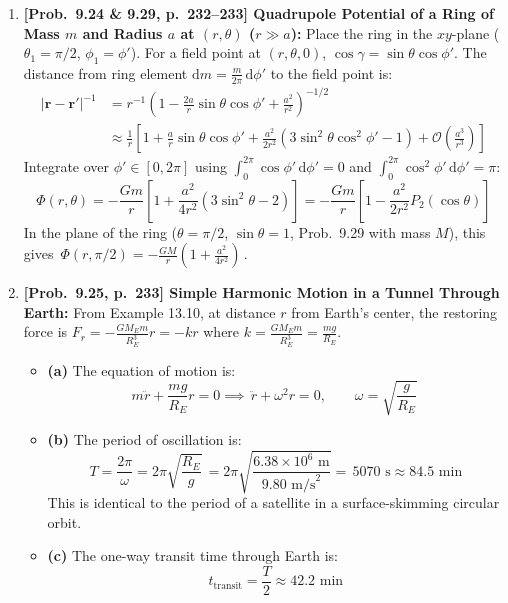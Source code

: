 \documentclass[11pt,a4paper,openany,oneside]{book}
\newcommand{\eqbox}[1]{\boxed{\,#1\,}}
\newcommand{\vect}[1]{\mathbf{#1}}
\newcommand{\dd}{\,\mathrm{d}}
\newcommand{\diff}{\mathrm{d}}
\numberwithin{equation}{chapter}
\begin{document}
\begin{enumerate}[label=\textbf{Prob.\ 9.\arabic*},leftmargin=4.2em]
  \item \textbf{[Prob.\ 9.24 \& 9.29, p.\ 232--233] Quadrupole Potential of a Ring of Mass $m$ and Radius $a$ at $(r,\theta)$ ($r \gg a$):}
  Place the ring in the $xy$-plane ($\theta_1 = \pi/2$, $\phi_1 = \phi'$). For a field point at $(r,\theta,0)$, $\cos\gamma = \sin\theta\cos\phi'$. The distance from ring element $\diff m = \frac{m}{2\pi}\dd\phi'$ to the field point is:
  \begin{align*}
    |\vect{r}-\vect{r}'|^{-1} &= r^{-1}\!\left(1 - \frac{2a}{r}\sin\theta\cos\phi' + \frac{a^2}{r^2}\right)^{-1/2}\\
    &\approx \frac{1}{r}\!\left[1 + \frac{a}{r}\sin\theta\cos\phi' + \frac{a^2}{2r^2}(3\sin^2\theta\cos^2\phi' - 1) + \mathcal{O}\!\left(\frac{a^3}{r^3}\right)\right]
  \end{align*}
  Integrate over $\phi'\in [0, 2\pi]$ using $\int_0^{2\pi}\cos\phi'\dd\phi' = 0$ and $\int_0^{2\pi}\cos^2\phi'\dd\phi' = \pi$:
  \begin{equation*}
    \eqbox{\Phi(r,\theta) = -\frac{Gm}{r}\!\left[1 + \frac{a^2}{4r^2}(3\sin^2\theta - 2)\right] = -\frac{Gm}{r}\!\left[1 - \frac{a^2}{2r^2}P_2(\cos\theta)\right]}
  \end{equation*}
  In the plane of the ring ($\theta = \pi/2$, $\sin\theta = 1$, Prob.\ 9.29 with mass $M$), this gives $\eqbox{\Phi(r,\pi/2) = -\frac{GM}{r}\!\left(1 + \frac{a^2}{4r^2}\right)}$.

  \item \textbf{[Prob.\ 9.25, p.\ 233] Simple Harmonic Motion in a Tunnel Through Earth:}
  From Example 13.10, at distance $r$ from Earth's center, the restoring force is $F_r = -\frac{GM_E m}{R_E^3}r = -kr$ where $k = \frac{GM_E m}{R_E^3} = \frac{mg}{R_E}$.
  \begin{itemize}
    \item \textbf{(a)} The equation of motion is:
    \begin{equation*}
      m\ddot{r} + \frac{mg}{R_E}r = 0 \implies \eqbox{\ddot{r} + \omega^2 r = 0, \qquad \omega = \sqrt{\frac{g}{R_E}}}
    \end{equation*}
    \item \textbf{(b)} The period of oscillation is:
    \begin{equation*}
      \eqbox{T = \frac{2\pi}{\omega} = 2\pi\sqrt{\frac{R_E}{g}}} = 2\pi\sqrt{\frac{6.38\times 10^6\text{ m}}{9.80\text{ m/s}^2}} = \eqbox{5070\text{ s} \approx 84.5\text{ min}}
    \end{equation*}
    This is identical to the period of a satellite in a surface-skimming circular orbit.
    \item \textbf{(c)} The one-way transit time through Earth is:
    \begin{equation*}
      \eqbox{t_{\text{transit}} = \frac{T}{2} \approx 42.2\text{ min}}
    \end{equation*}
  \end{itemize}


\end{enumerate}
\end{document}
